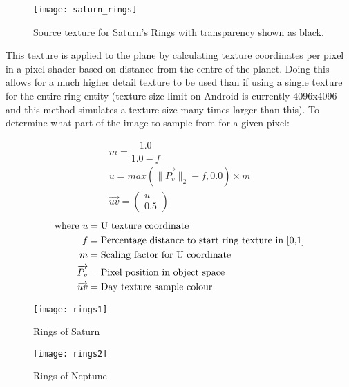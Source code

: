 \begin{figure}[!htbp]
\centering
  \centering
  \texttt{[image: saturn\_rings]}
  \caption{Source texture for Saturn's Rings with transparency shown as black.}
  \label{fig:satrings}
\end{figure}

This texture is applied to the plane by calculating texture coordinates per pixel in a pixel shader based on distance from the centre of the planet. Doing this allows for a much higher detail texture to be used than if using a single texture for the entire ring entity (texture size limit on Android is currently 4096x4096 and this method simulates a texture size many times larger than this). To determine what part of the image to sample from for a given pixel:

\singlespacing
\vspace{-10pt}
\begin{align}
m = \dfrac{1.0}{1.0-f} \\
u = max(\|\overrightarrow{P_v}\|_2-f,0.0)\times m \\
\overrightarrow{uv} =\begin{pmatrix}
 u \\ 
 0.5
 \end{pmatrix}
\end{align}
\vspace{-10pt}
\begin{align*}
\text{where}~
u &= \text{U texture coordinate} \notag\\
f &= \text{Percentage distance to start ring texture in [0,1]} \notag\\
m &= \text{Scaling factor for U coordinate} \notag\\
\overrightarrow{P_v} &= \text{Pixel position in object space} \notag\\
\overrightarrow{uv} &= \text{Day texture sample colour} \notag\\
\end{align*}
\vspace{-25pt}

\begin{figure}[!htbp]
\centering
\begin{minipage}{.5\textwidth}
  \centering
  \texttt{[image: rings1]}
  \caption{Rings of Saturn}
  \label{fig:rings1}
\end{minipage}%
\begin{minipage}{.5\textwidth}
  \centering
  \texttt{[image: rings2]}
  \caption{Rings of Neptune}
  \label{fig:rings2}
\end{minipage}
\end{figure}
\onehalfspacing

